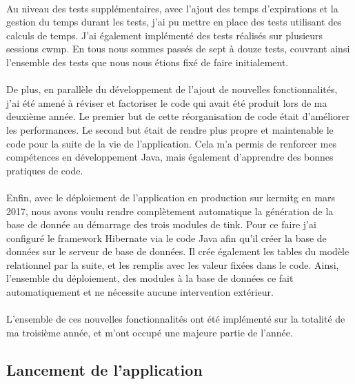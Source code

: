 \documentclass[12pt,a4paper]{report}
\begin{document}
\paragraph*{}Au niveau des tests supplémentaires, avec l'ajout des temps d'expirations et la gestion du temps durant les tests, j'ai pu mettre en place des tests utilisant des calculs de temps. J'ai également implémenté des tests réalisés sur plusieurs sessions \gls{cwmp}. En tous nous sommes passés de sept à douze tests, couvrant ainsi l'ensemble des tests que nous nous étions fixé de faire initialement.
\paragraph*{}De plus, en parallèle du développement de l'ajout de nouvelles fonctionnalités, j'ai été amené à réviser et factoriser le code qui avait été produit lors de ma deuxième année. Le premier but de cette réorganisation de code était d'améliorer les performances. Le second but était de rendre plus propre et maintenable le code pour la suite de la vie de l'application. Cela m'a permis de renforcer mes compétences en développement Java, mais également d'apprendre des bonnes pratiques de code.
\paragraph*{} Enfin, avec le déploiement de l'application en production sur \gls{kermitg} en mars 2017, nous avons voulu rendre complètement automatique la génération de la base de donnée au démarrage des trois modules de \gls{tink}. Pour ce faire j'ai configuré le framework Hibernate via le code Java afin qu'il créer la base de données sur le serveur de base de données. Il crée également les tables du modèle relationnel par la suite, et les remplis avec les valeur fixées dans le code. Ainsi, l'ensemble du déploiement, des modules à la base de données ce fait automatiquement et ne nécessite aucune intervention extérieur.
\paragraph*{} L'ensemble de ces nouvelles fonctionnalités ont été implémenté sur la totalité de ma troisième année, et m'ont occupé une majeure partie de l'année. \\

\subsection{Lancement de l'application}
\end{document}
